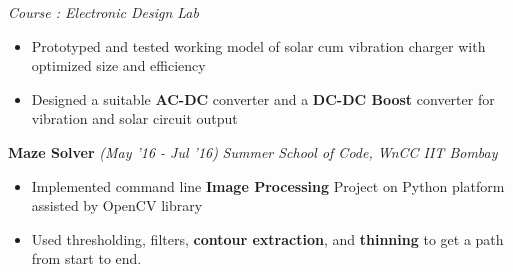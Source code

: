 \documentclass[10 pt]{article}%
\begin{document}
{{{{{{{{{	\vspace{-0.8em}
	{\flushleft \em{Course : Electronic Design Lab}}
	\vspace{-5pt}
	\begin{itemize}[leftmargin=*]
		\setlength\itemsep{1pt}
		\setlength\parskip{1pt}
			\item Prototyped and tested working model of solar cum vibration charger with optimized size and efficiency
			\item Designed a suitable \textbf{AC-DC} converter and a \textbf{DC-DC Boost} converter for vibration and solar circuit output
	\end{itemize}
{\flushleft \textbf {\large{Maze Solver}} \hfill {{{\em{(May '16 - Jul '16)}}}}
	\vspace{-0.8em}
	{\flushleft \em{Summer School of Code, WnCC IIT Bombay}}
	\vspace{-5pt}
	\begin{itemize}[leftmargin=*]
		\setlength\itemsep{1pt}
		\setlength\parskip{1pt}
		\item Implemented command line \textbf{Image Processing} Project on Python platform assisted by OpenCV library
		\item Used thresholding, filters, \textbf{contour extraction}, and \textbf{thinning} to get a path from start to end.
	\end{itemize}



}}}}}}}}}}
\end{document}
